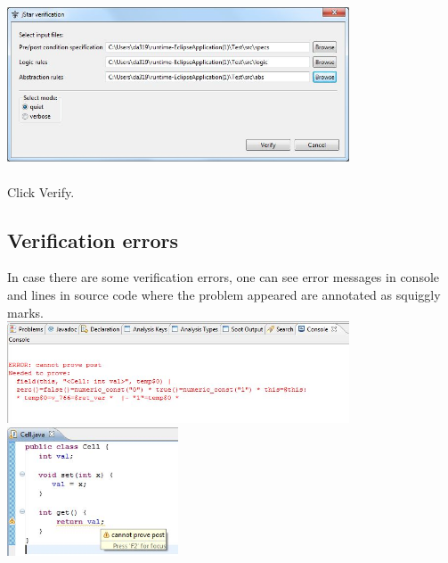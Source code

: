 \documentclass{article}
\begin{document}
\includegraphics[width=4in]{images/verificationWindow.jpg}
\\\\Click Verify. 

\subsection* {Verification errors}

In case there are some verification errors, one can see error messages in console and lines in source code where the problem appeared are annotated as squiggly marks.\\

\includegraphics[width=4in]{images/console.jpg}\\

\includegraphics[width=2in]{images/marker.jpg}
\end{document}
